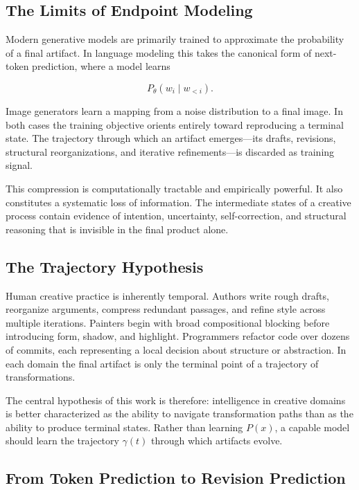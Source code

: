 \documentclass[12pt,a4paper]{article}
\theoremstyle{draftthm}
\newcommand{\traj}{\gamma}
\begin{document}
\subsection{The Limits of Endpoint Modeling}

Modern generative models are primarily trained to approximate the probability of a final artifact. In language modeling this takes the canonical form of next-token prediction, where a model learns

\begin{equation}
  P_{\theta}(w_i \mid w_{<i}).
\end{equation}

Image generators learn a mapping from a noise distribution to a final image. In both cases the training objective orients entirely toward reproducing a terminal state. The trajectory through which an artifact emerges---its drafts, revisions, structural reorganizations, and iterative refinements---is discarded as training signal.

This compression is computationally tractable and empirically powerful. It also constitutes a systematic loss of information. The intermediate states of a creative process contain evidence of intention, uncertainty, self-correction, and structural reasoning that is invisible in the final product alone.

\subsection{The Trajectory Hypothesis}

Human creative practice is inherently temporal. Authors write rough drafts, reorganize arguments, compress redundant passages, and refine style across multiple iterations. Painters begin with broad compositional blocking before introducing form, shadow, and highlight. Programmers refactor code over dozens of commits, each representing a local decision about structure or abstraction. In each domain the final artifact is only the terminal point of a trajectory of transformations.

The central hypothesis of this work is therefore: intelligence in creative domains is better characterized as the ability to navigate transformation paths than as the ability to produce terminal states. Rather than learning $P(x)$, a capable model should learn the trajectory $\traj(t)$ through which artifacts evolve.

\subsection{From Token Prediction to Revision Prediction}
\end{document}
